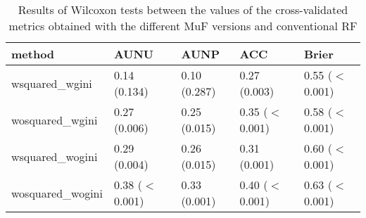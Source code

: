 \begin{table}[ht]
\centering
\begin{tabular}{lllll}
  \hline
method & AUNU & AUNP & ACC & Brier \\ 
  \hline
wsquared\_wgini & 0.14 (0.134) & 0.10 (0.287) & 0.27 (0.003) & 0.55 ($<$ 0.001) \\ 
  wosquared\_wgini & 0.27 (0.006) & 0.25 (0.015) & 0.35 ($<$ 0.001) & 0.58 ($<$ 0.001) \\ 
  wsquared\_wogini & 0.29 (0.004) & 0.26 (0.015) & 0.31 (0.001) & 0.60 ($<$ 0.001) \\ 
  wosquared\_wogini & 0.38 ($<$ 0.001) & 0.33 (0.001) & 0.40 ($<$ 0.001) & 0.63 ($<$ 0.001) \\ 
   \hline
\end{tabular}
\caption{Results of Wilcoxon tests between the values of the cross-validated metrics obtained with the different MuF versions and conventional RF} 
\label{tab:wilcox_test}
\end{table}
